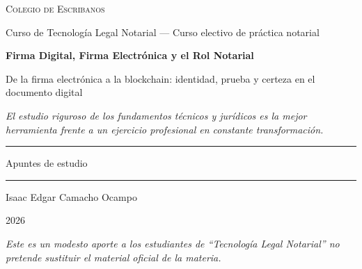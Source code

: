 \documentclass[12pt,oneside]{book}
\newcommand{\universidad}{Colegio de Escribanos}
\newcommand{\carrera}{Curso de Tecnología Legal Notarial --- Curso electivo de práctica notarial}
\newcommand{\materia}{Firma Digital, Firma Electrónica y el Rol Notarial}
\newcommand{\titulo}{De la firma electrónica a la blockchain: identidad, prueba y certeza en el documento digital}
\newcommand{\autor}{Isaac Edgar Camacho Ocampo}
\newcommand{\anio}{2026}
\begin{document}
\begin{titlepage}

\thispagestyle{empty}

\begin{center}

\vspace*{1cm}

{\large \textsc{\universidad}}

\vspace{0.2cm}

{\large \carrera}

\vspace{3cm}

{\Huge \textbf{\materia}}

\vspace{1cm}

{\LARGE \titulo}

\vspace{0.8cm}

\textit{El estudio riguroso de los fundamentos técnicos y jurídicos es la mejor herramienta frente a un ejercicio profesional en constante transformación.}

\vspace{1.2cm}

\rule{0.70\textwidth}{0.5pt}

\vspace{0.5cm}

{\large Apuntes de estudio}

\vspace{0.5cm}

\rule{0.70\textwidth}{0.5pt}

\vfill

{\large \autor}

\vspace{0.3cm}

{\large \anio}

\end{center}

\vfill

\begin{flushleft}
\textit{Este es un modesto aporte a los estudiantes de ``Tecnología Legal Notarial'' no pretende sustituir el material oficial de la materia.}
\end{flushleft}

\end{titlepage}
\end{document}
